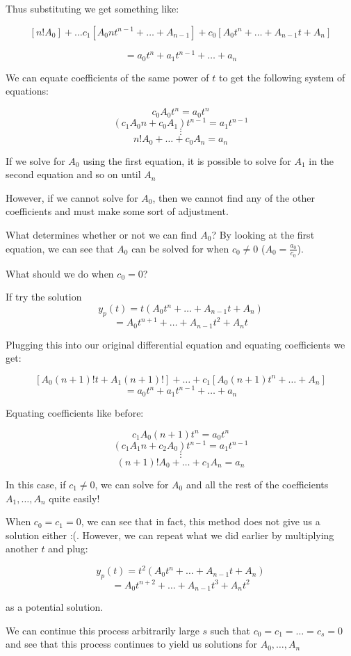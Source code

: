\documentclass{report}
\begin{document}
Thus substituting we get something like:

$$[n!A_0] + \dots c_1[A_0nt^{n-1}+\dots+A_{n-1}] + c_0[A_0t^n + \dots + A_{n-1}t + A_n]$$

$$= a_0t^n + a_1t^{n-1} + \dots + a_n$$

We can equate coefficients of the same power of $t$ to get the following system of equations:

$$c_0A_0t^n = a_0t^n$$
$$(c_1A_0n + c_0A_1)t^{n-1} = a_1t^{n-1}$$
$$\vdots$$
$$n!A_0 + \dots + c_0A_n = a_n$$


If we solve for $A_0$ using the first equation, it is possible to solve for $A_1$ in the second equation and so on until $A_n$

However, if we cannot solve for $A_0$, then we cannot find any of the other coefficients and must make some sort of adjustment.

What determines whether or not we can find $A_0$? By looking at the first equation, we can see that $A_0$ can be solved for when $c_0 \neq 0$ ($A_0 = \frac{a_0}{c_0}$).

What should we do when $c_0 = 0$?

If try the solution
$$y_p(t) = t(A_0t^n + \dots + A_{n-1}t + A_n)$$
$$=A_0t^{n+1} + \dots + A_{n-1}t^2 + A_nt$$


Plugging this into our original differential equation and equating coefficients we get:

$$[A_0(n+1)!t+A_1(n+1)!] + \dots + c_1[A_0(n+1)t^n+\dots + A_n]$$
$$= a_0t^n + a_1t^{n-1} + \dots + a_n$$

Equating coefficients like before:

$$c_1A_0(n+1)t^n = a_0t^n$$
$$(c_1A_1n+c_2A_0)t^{n-1} = a_1t^{n-1}$$
$$\vdots$$
$$(n+1)!A_0 + \dots + c_1A_{n} = a_n$$

In this case, if $c_1 \neq 0$, we can solve for $A_0$ and all the rest of the coefficients $A_1, \dots, A_n$ quite easily!

When $c_0=c_1=0$, we can see that in fact, this method does not give us a solution either :(. However, we can repeat what we did earlier by multiplying another $t$ and plug:

$$y_p(t) = t^2(A_0t^n + \dots + A_{n-1}t + A_n)$$
$$=A_0t^{n+2} + \dots + A_{n-1}t^3 + A_nt^2$$

as a potential solution.

We can continue this process arbitrarily large $s$ such that $c_0=c_1=\dots=c_s=0$ and see that this process continues to yield us solutions for $A_0, \dots, A_n$
\end{document}
